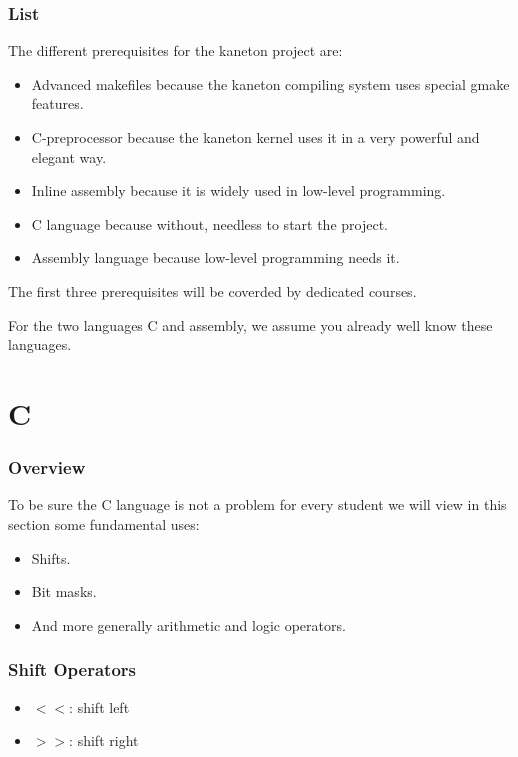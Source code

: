\begin{frame}
  \frametitle{List}

  The different prerequisites for the kaneton project are:

  \begin{itemize}[<+->]
    \item
      Advanced makefiles because the kaneton compiling system uses special
      gmake features.
    \item
      C-preprocessor because the kaneton kernel uses it in a very powerful
      and elegant way.
    \item
      Inline assembly because it is widely used in low-level programming.
    \item
      C language because without, needless to start the project.
    \item
      Assembly language because low-level programming needs it.
  \end{itemize}

  \-

  The first three prerequisites will be coverded by dedicated courses.

  \-

  For the two languages C and assembly, we assume you already well know these
  languages.
\end{frame}

%
%

\section{C}


\begin{frame}
  \frametitle{Overview}

  To be sure the C language is not a problem for every student we
  will view in this section some fundamental uses:

  \begin{itemize}
    \item
      Shifts.
    \item
      Bit masks.
    \item
      And more generally arithmetic and logic operators.
  \end{itemize}
\end{frame}


\begin{frame}
  \frametitle{Shift Operators}

  \begin{itemize}[<+->]
    \item
      $<<$: shift left
    \item
      $>>$: shift right
  \end{itemize}
\end{frame}


